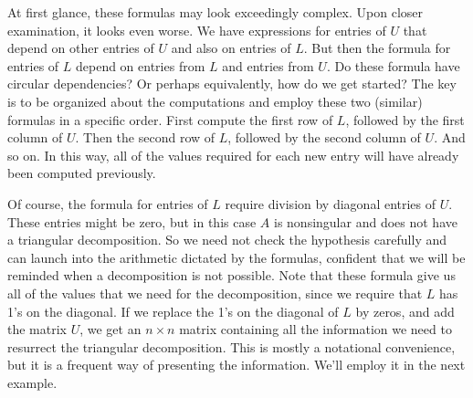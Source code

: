 %
At first glance, these formulas may look exceedingly complex.  Upon closer examination, it looks even worse.  We have expressions for entries of $U$ that depend on other entries of $U$ and also on entries of $L$.  But then the formula for entries of $L$ depend on entries from $L$ and entries from $U$.  Do these formula have circular dependencies?  Or perhaps equivalently, how do we get started?  The key is to be organized about the computations and employ these two (similar) formulas in a specific order.  First compute the first row of $L$, followed by the first column of $U$.  Then the second row of $L$, followed by the second column of $U$.  And so on.  In this way, all of the values required for each new entry will have already been computed previously.\par
%
Of course, the formula for entries of $L$ require division by diagonal entries of $U$.  These entries might be zero, but in this case $A$ is nonsingular and does not have a triangular decomposition.  So we need not check the hypothesis carefully and can launch into the arithmetic dictated by the formulas, confident that we will be reminded when a decomposition is not possible.  Note that these formula give us all of the values that we need for the decomposition, since we require that $L$ has 1's on the diagonal.  If we replace the 1's on the diagonal of $L$ by zeros, and add the matrix $U$, we get an $n\times n$ matrix containing all the information we need to resurrect the triangular decomposition.  This is mostly a notational convenience, but it is a frequent way of presenting the information.  We'll employ it in the next example.
%
%
